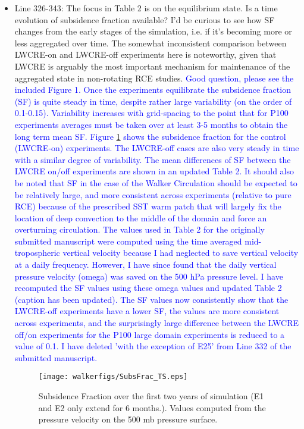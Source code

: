 \documentclass[draft]{agujournal2019}
\begin{document}
\begin{itemize}
  \item Line 326-343: The focus in Table 2 is on the equilibrium state. Is a time evolution of subsidence fraction available? I'd be curious to see how SF changes from the early stages of the simulation, i.e. if it's becoming more or less aggregated over time. The somewhat inconsistent comparison between LWCRE-on and LWCRE-off experiments here is noteworthy, given that LWCRE is arguably the most important mechanism for maintenance of the aggregated state in non-rotating RCE studies.
\textcolor{blue}{Good question, please see the included Figure 1.  Once the experiments equilibrate the subsidence fraction (SF) is quite steady in time, despite rather large variability (on the order of 0.1-0.15).   Variability increases with grid-spacing to the point that for P100 experiments averages must be taken over at least 3-5 months to obtain the long term mean SF.
Figure \ref{fig:subsfracTS}  
shows the subsidence fraction for the control (LWCRE-on) experiments.  The LWCRE-off cases are also very steady in time with a similar degree of variability.  The mean 
differences of SF between the LWCRE on/off experiments are shown in an updated Table 2.  It should also be noted that SF in the case of the Walker 
Circulation should be expected to be relatively large, and more consistent across experiments (relative to pure RCE) because of the prescribed SST warm 
patch that will largely fix the location of deep convection to the middle of the domain and force an overturning circulation.  
The values used in Table 2 for the originally submitted manuscript were computed 
using the time averaged mid-tropospheric vertical velocity because I had neglected to save vertical velocity at a daily frequency.  However, I have since 
found that the daily vertical pressure velocity (omega) was saved on the 500 hPa pressure level.  I have recomputed the SF values using these omega values
and updated Table 2 (caption has been updated).  The SF values now consistently show that the LWCRE-off experiments have a lower SF, the values are more consistent across experiments, and the surprisingly large difference between the LWCRE off/on experiments for the P100 large domain experiments is reduced to a value of 0.1.  I have deleted 'with the exception of E25' from Line 332 of the submitted manuscript.}

\begin{figure}
  \centering
    \texttt{[image: walkerfigs/SubsFrac\_TS.eps]}  
  \caption{Subsidence Fraction over the first two years of simulation (E1 and E2 only extend for 6 months.).  Values computed from the pressure 
  velocity on the 500 mb pressure surface.}
  \label{fig:subsfracTS}
\end{figure}  
  

\end{itemize}
\end{document}
